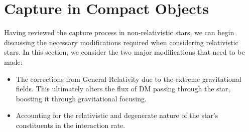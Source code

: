 

\section{Capture in Compact Objects}
\label{ch3:sec:captrue_new_full}

Having reviewed the capture process in non-relativistic stars, we can begin discussing the necessary modifications required when considering relativistic stars. In this section, we consider the two major modifications that need to be made: 
\begin{itemize}
    \item The corrections from General Relativity due to the extreme gravitational fields. This ultimately alters the flux of DM passing through the star, boosting it through gravitational focusing.
    \item Accounting for the relativistic and degenerate nature of the star's constituents in the interaction rate.
\end{itemize}

